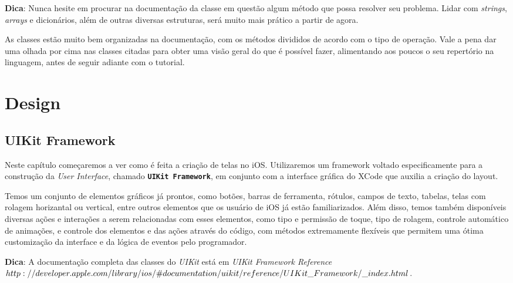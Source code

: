 \documentclass[a4paper,12pt,brazil,doubleside]{book}
\begin{document}
\begin{singlespace}
\begin{framed}

\textbf{Dica}: Nunca hesite em procurar na documentação da classe em questão algum método que possa resolver seu problema. Lidar com \textit{strings}, \textit{arrays} e dicionários, além de outras diversas estruturas, será muito mais prático a partir de agora.
\end{framed}


As classes estão muito bem organizadas na documentação, com os métodos divididos de acordo com o tipo de operação. Vale a pena dar uma olhada por cima nas classes citadas para obter uma visão geral do que é possível fazer, alimentando aos poucos o seu repertório na linguagem, antes de seguir adiante com o tutorial.


\chapter{Design}

\section{UIKit Framework}


Neste capítulo começaremos a ver como é feita a criação de telas no iOS. Utilizaremos um framework voltado especificamente para a construção da \emph{User Interface}, chamado \texttt{\textbf{UIKit Framework}}, em conjunto com a interface gráfica do XCode que auxilia a criação do layout.

Temos um conjunto de elementos gráficos já prontos, como botões, barras de ferramenta, rótulos, campos de texto, tabelas, telas com rolagem horizantal ou vertical, entre outros elementos que os usuário de iOS já estão familiarizados. Além disso, temos também disponíveis diversas ações e interações a serem relacionadas com esses elementos, como tipo e permissão de toque, tipo de rolagem, controle automático de animações, e controle dos elementos e das ações através do código, com métodos extremamente flexíveis que permitem uma ótima customização da interface e da lógica de eventos pelo programador.

\begin{framed}

\textbf{Dica}:  A documentação completa das classes do \textit{UIKit} está em 
\textit{ UIKit Framework Reference\\ \(http://developer.apple.com/library/ios/\#documentation/uikit/reference/\\UIKit\_Framework/\_index.html\)}.
\end{framed}



\end{singlespace}
\end{document}
